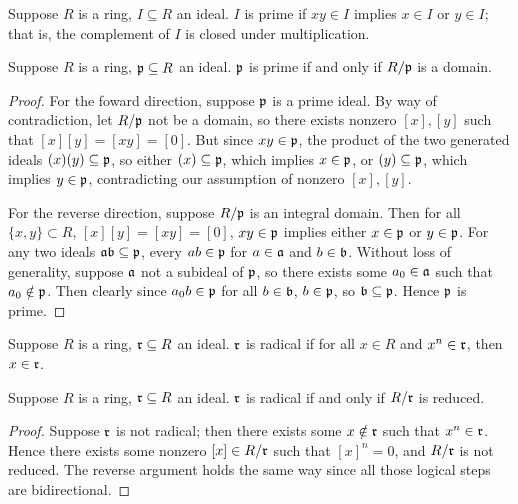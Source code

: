 \begin{definition}
    Suppose \(R\) is a ring, \(I \subseteq R\) an ideal.
    \(I\) is prime if \(xy \in I\) implies \(x \in I\) or \(y \in I\);
    that is, the complement of \(I\) is closed under multiplication.
\end{definition}
\begin{theorem}\label{thm:prime-quotient-domain}
    Suppose \(R\) is a ring, \(\mathfrak{p} \subseteq R\) an ideal.
    \(\mathfrak{p}\) is prime if and only if \(R/\mathfrak{p}\) is a domain.
\end{theorem}
\begin{proof}
    For the foward direction, suppose \(\mathfrak{p}\) is a prime ideal.
    By way of contradiction, let \(R/\mathfrak{p}\) not be a domain,
    so there exists nonzero \([x], [y]\) such that \([x][y] = [xy] = [0]\).
    But since \(xy \in \mathfrak{p}\),
    the product of the two generated ideals \((x)(y) \subseteq \mathfrak{p}\),
    so either \((x) \subseteq \mathfrak{p}\), which implies \(x \in \mathfrak{p}\),
    or \((y) \subseteq \mathfrak{p}\), which implies \(y \in \mathfrak{p}\),
    contradicting our assumption of nonzero \([x],[y]\).

    For the reverse direction, suppose \(R/\mathfrak{p}\) is an integral domain.
    Then for all \(\{x,y\} \subset R\), \([x][y] = [xy] = [0]\),
    \(xy \in \mathfrak{p}\) implies either \(x \in \mathfrak{p}\) or \(y \in \mathfrak{p}\).
    For any two ideals \(\mathfrak{ab} \subseteq \mathfrak{p}\),
    every \(ab \in \mathfrak{p}\) for \(a \in \mathfrak{a}\) and \(b \in \mathfrak{b}\).
    Without loss of generality, suppose \(\mathfrak{a}\) not a subideal of \(\mathfrak{p}\),
    so there exists some \(a_0 \in \mathfrak{a}\) such that \(a_0 \notin \mathfrak{p}\).
    Then clearly since \(a_0 b \in \mathfrak{p}\) for all \(b \in \mathfrak{b}\),
    \(b \in \mathfrak{p}\), so \(\mathfrak{b} \subseteq \mathfrak{p}\).
    Hence \(\mathfrak{p}\) is prime.
\end{proof}

\begin{definition}
    Suppose \(R\) is a ring, \(\mathfrak{r} \subseteq R\) an ideal.
    \(\mathfrak{r}\) is radical if for all \(x \in R\) and \(x^n \in \mathfrak{r}\), then \(x \in \mathfrak{r}\).
\end{definition}
\begin{theorem}\label{thm:radical-quotient-reduced}
    Suppose \(R\) is a ring, \(\mathfrak{r} \subseteq R\) an ideal.
    \(\mathfrak{r}\) is radical if and only if \(R/\mathfrak{r}\) is reduced.
\end{theorem}
\begin{proof}
    Suppose \(\mathfrak{r}\) is not radical;
    then there exists some \(x \notin \mathfrak{r}\) such that \(x^n \in \mathfrak{r}\).
    Hence there exists some nonzero \([x] \in R/\mathfrak{r}\) such that \({[x]}^n = 0\),
    and \(R/\mathfrak{r}\) is not reduced.
    The reverse argument holds the same way since all those logical steps are bidirectional.
\end{proof}

